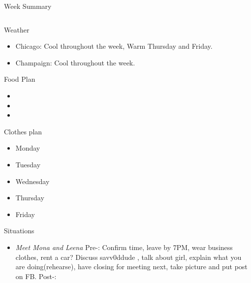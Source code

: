 \documentclass[serif, mathserif, final]{beamer}
\begin{document}
\begin{frame}
\begin{columns}
\begin{column}{0.5\linewidth}
\begin{block}{Week Summary}
\begin{column}{0.25\linewidth}

      \begin{block}{Weather}
        \begin{itemize}
          \tiny \item \tiny Chicago: Cool throughout the week, Warm
          Thursday and Friday. 
          \item \tiny Champaign: Cool throughout the week. 
        \end{itemize}
      \end{block} 

      \begin{block}{Food Plan} 
        \begin{itemize}
          \tiny \item \tiny 
        \item \tiny 
        \item \tiny 
        \end{itemize}
      \end{block} 

      \begin{block}{Clothes plan} 
        \begin{itemize}
          \tiny \item \tiny Monday
        \item \tiny Tuesday
        \item \tiny Wednesday
        \item \tiny Thursday
        \item \tiny Friday
        \end{itemize} 
      \end{block}

      \begin{block}{Situations}
        \begin{itemize}

        \item \tiny \textit{Meet Mona and Leena} 
          Pre-: Confirm time, leave by 7PM, wear business clothes, rent a car? Discuss
          savv0ddude , talk about girl, explain what you are doing(rehearse),
          have closing for meeting next, take picture and put post on
          FB. 
          Post-:          
        \end{itemize} 
      \end{block} 


\end{column}
\end{block}
\end{column}
\end{columns}
\end{frame}
\end{document}
